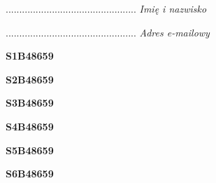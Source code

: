 \begin{turn}{90}\begin{minipage}{\linewidth} \vspace{20mm} ................................................  \textit{Imię i nazwisko}\end{minipage}\end{turn}

\begin{turn}{90}\begin{minipage}{\linewidth} \vspace{20mm} ................................................  \textit{Adres e-mailowy}\end{minipage}\end{turn}

\begin{turn}{90}\huge \begin{minipage}{\linewidth} \vspace{10mm}\textbf{S1B48659}\end{minipage}\end{turn}

\begin{turn}{90}\huge \begin{minipage}{\linewidth} \vspace{10mm}\textbf{S2B48659}\end{minipage}\end{turn}

\begin{turn}{90}\huge \begin{minipage}{\linewidth} \vspace{10mm}\textbf{S3B48659}\end{minipage}\end{turn}

\begin{turn}{90}\huge \begin{minipage}{\linewidth} \vspace{10mm}\textbf{S4B48659}\end{minipage}\end{turn}

\begin{turn}{90}\huge \begin{minipage}{\linewidth} \vspace{10mm}\textbf{S5B48659}\end{minipage}\end{turn}

\begin{turn}{90}\huge \begin{minipage}{\linewidth} \vspace{10mm}\textbf{S6B48659}\end{minipage}\end{turn}

